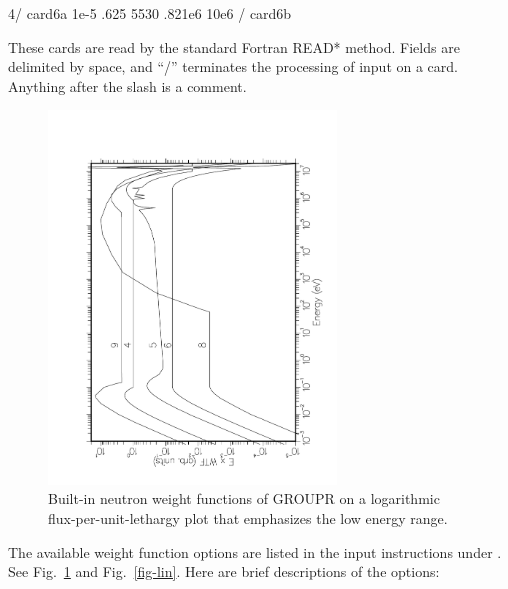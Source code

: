 \small
\begin{ccode}

   4/ card6a
   1e-5 .625 5530 .821e6 10e6 / card6b

\end{ccode}
\normalsize

\noindent
These cards are read by the standard Fortran READ* method.
Fields are delimited by space, and ``/'' terminates the processing
of input on a card.  Anything after the slash is a comment.

\begin{figure}[t]\centering
\includegraphics[keepaspectratio, height=3.9in, angle=270]{figs/appb1ack}
\caption[GROUPR weight functions on a logarithmic flux/unit lethargy
 scale]{Built-in neutron weight functions of GROUPR on a logarithmic
 flux-per-unit-lethargy plot that emphasizes the low energy range.}
\label{fig-leth}
\end{figure}

The available weight function options are listed in the input
instructions under .  See Fig.~\ref{fig-leth} and
Fig.~\ref{fig-lin}.  Here are brief descriptions of the options:

